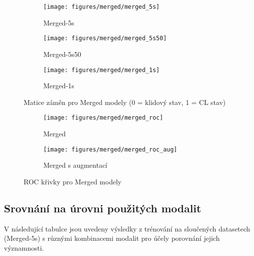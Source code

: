 \begin{figure}[!htb]
    \centering
    \begin{subfigure}[h]{0.32\linewidth}
        \texttt{[image: figures/merged/merged\_5s]}
        \caption{Merged-5s}
    \end{subfigure}
    \hspace{0.05cm}
    \begin{subfigure}[h]{0.32\linewidth}
        \texttt{[image: figures/merged/merged\_5s50]}
        \caption{Merged-5s50}
    \end{subfigure}
    \hspace{0.05cm}
    \begin{subfigure}[h]{0.32\linewidth}
        \texttt{[image: figures/merged/merged\_1s]}
        \caption{Merged-1s}
    \end{subfigure}
    \caption{Matice záměn pro Merged modely (0 = klidový stav, 1 = CL stav)}
    \label{fig:results_cm_merged}
\end{figure}

\begin{figure}[!htb]
    \centering
    \begin{subfigure}[h]{0.42\linewidth}
        \texttt{[image: figures/merged/merged\_roc]}
        \caption{Merged}
    \end{subfigure}
    \hspace{0.1cm}
    \begin{subfigure}[h]{0.42\linewidth}
        \texttt{[image: figures/merged/merged\_roc\_aug]}
        \caption{Merged s augmentací}
    \end{subfigure}
    \caption{ROC křivky pro Merged modely}
    \label{fig:results_roc_merged}
\end{figure}

\subsection{Srovnání na úrovni použitých modalit}
\label{subsec:features_comparison}
V následující tabulce jsou uvedeny výsledky z trénování na sloučených datasetech
(Merged-5s) s různými kombinacemi modalit pro účely porovnání jejich
významnosti.

